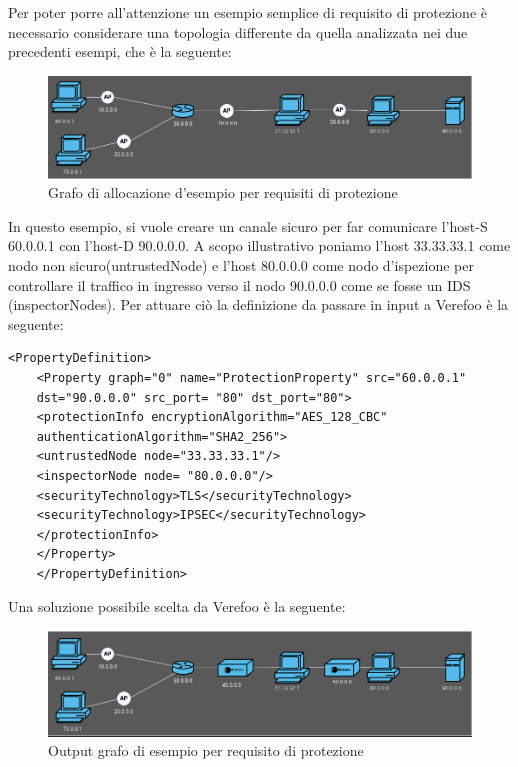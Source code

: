 \newpage
Per poter porre all'attenzione un esempio semplice di requisito di protezione è necessario considerare una topologia differente da quella analizzata nei due precedenti esempi, che è la seguente:

\begin{figure}[h]  %
    \centering
    \includegraphics[width=1\textwidth]{EsempioProtection.png}  %
    \caption{Grafo di allocazione d'esempio per requisiti di protezione}
    \label{fig:EsempioProtection}
\end{figure}

In questo esempio, si vuole creare un canale sicuro per far comunicare l'host-S 60.0.0.1 con l'host-D 90.0.0.0. A scopo illustrativo poniamo l'host 33.33.33.1 come nodo non sicuro(untrustedNode)
e l'host 80.0.0.0 come nodo d'ispezione per controllare il traffico in ingresso verso il nodo 90.0.0.0 come se fosse un IDS (inspectorNodes).
Per attuare ciò la definizione da passare in input a Verefoo è la seguente: 

\begin{lstlisting}[style=mystyle,caption={Esempio di requisito di protezione}]
    <PropertyDefinition>
    <Property graph="0" name="ProtectionProperty" src="60.0.0.1"
    dst="90.0.0.0" src_port= "80" dst_port="80">
    <protectionInfo encryptionAlgorithm="AES_128_CBC"
    authenticationAlgorithm="SHA2_256">
    <untrustedNode node="33.33.33.1"/>
    <inspectorNode node= "80.0.0.0"/>
    <securityTechnology>TLS</securityTechnology>
    <securityTechnology>IPSEC</securityTechnology>
    </protectionInfo>
    </Property>
    </PropertyDefinition>
\end{lstlisting}

Una soluzione possibile scelta da Verefoo è la seguente:

\begin{figure}[h]  %
    \centering
    \includegraphics[width=1\textwidth]{ProectionProp.png}  %
    \caption{Output grafo di esempio per requisito di protezione}
    \label{fig:ProtectionRisolta}
\end{figure}

